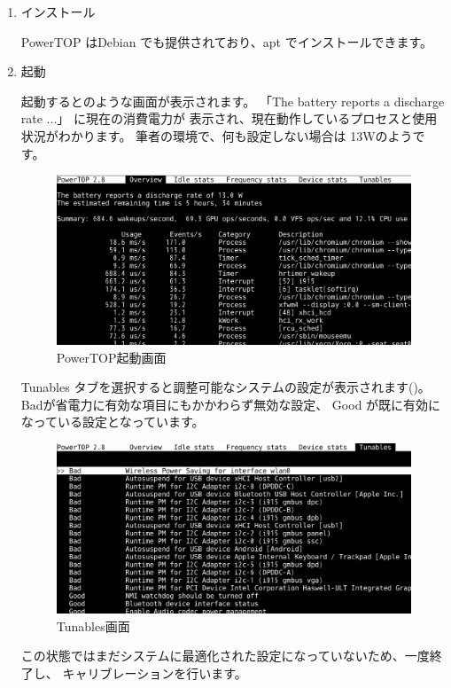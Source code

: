\documentclass[mingoth,a4paper]{jsarticle}
\begin{document}
\begin{enumerate}

\item インストール

PowerTOP はDebian でも提供されており、apt でインストールできます。

\item 起動

起動するとのような画面が表示されます。
「The battery reports a discharge rate ...」 に現在の消費電力が
表示され、現在動作しているプロセスと使用状況がわかります。
筆者の環境で、何も設定しない場合は 13Wのようです。

\begin{figure}[H]
\begin{center}
\includegraphics[width=0.5\hsize]{image201602/powertop_00.png}
\end{center}
\caption{PowerTOP起動画面} 
\label{fig:powertop0}
\end{figure}

Tunables タブを選択すると調整可能なシステムの設定が表示されます()。
Badが省電力に有効な項目にもかかわらず無効な設定、
Good が既に有効になっている設定となっています。

\begin{figure}[H]
\begin{center}
\includegraphics[width=0.5\hsize]{image201602/powertop_01.png}
\end{center}
\caption{Tunables画面} 
\label{fig:powertop1}
\end{figure}

この状態ではまだシステムに最適化された設定になっていないため、一度終了し、
キャリブレーションを行います。


\end{enumerate}
\end{document}
